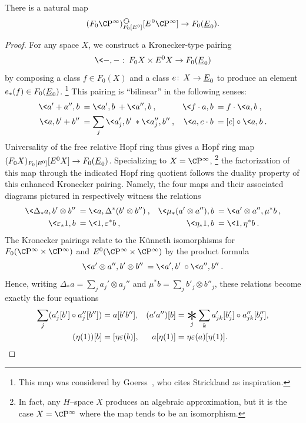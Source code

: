 \begin{lemma}\label{HopfRingComparisonMap}
There is a natural map \[(F_0 \CP^\infty)_{F_0[E^0]}^{\circulatearrows}[E^0 \CP^\infty] \to F_0(\OS{E}{0}).\]
\end{lemma}
\begin{proof}
For any space \(X\), we construct a Kronecker-type pairing \[\<-,-\>\co F_0 X \times E^0 X \to F_0(\OS{E}{0})\] by composing a class \(f \in F_0(X)\) and a class \(e\co X \to \OS{E}{0}\) to produce an element \(e_*(f) \in F_0(\OS{E}{0})\).%
\footnote{%
This map was considered by Goerss~\cite[Proposition 10.2]{GoerssDieudonne}, who cites Strickland as inspiration.
}
This pairing is ``bilinear'' in the following senses:
\begin{align*}
\<a' + a'', b\> & = \<a', b\> + \<a'', b\>, &
\<f \cdot a, b\> & = f \cdot \<a, b\>, \\
\<a, b' + b''\> & = \sum_j \<a'_j, b'\> \ast \<a''_j, b''\>, &
\<a, e \cdot b\> & = [e] \circ \<a, b\>.
\end{align*}
Universality of the free relative Hopf ring thus gives a Hopf ring map \((F_0 X)_{F_0[E^0]}[E^0 X] \to F_0(\OS{E}{0})\).
Specializing to \(X = \CP^\infty\),%
\footnote{%
In fact, any $H$--space $X$ produces an algebraic approximation, but it is the case $X = \CP^\infty$ where the map tends to be an isomorphism.
}
the factorization of this map through the indicated Hopf ring quotient follows the duality property of this enhanced Kronecker pairing.
Namely, the four maps and their associated diagrams pictured in  respectively witness the relations
\begin{align*}
\<\Delta_* a, b' \otimes b''\> & = \<a, \Delta^*(b' \otimes b'')\>, &
\<\mu_*(a' \otimes a''), b\> & = \<a' \otimes a'', \mu^* b\>, \\
\<\eps_* 1, b\> & = \<1, \eps^* b\>, &
\<\eta_* 1, b\> & = \<1, \eta^* b\>.
\end{align*}
The Kronecker pairings relate to the K\"unneth isomorphisms for \(F_0(\CP^\infty \times \CP^\infty)\) and \(E^0(\CP^\infty \times \CP^\infty)\) by the product formula \[\<a' \otimes a'', b' \otimes b''\> = \<a', b'\> \circ \<a'', b''\>.\]
Hence, writing \(\Delta_* a = \sum_j a_j' \otimes a_j''\) and \(\mu^* b = \sum_j b'_j \otimes b''_j\), these relations become exactly the four equations
\begin{align*}
\sum_j (a'_j[b'] \circ a''_j[b'']) & = a[b'b''], &
(a' a'')[b] & = \bigast_j \sum_k a_{jk}'[b'_j] \circ a_{jk}''[b''_j], \\
(\eta(1))[b] & = [\eta\eps(b)], &
a[\eta(1)] & = \eta\eps(a)[\eta(1)].
\qedhere
\end{align*}
\end{proof}


